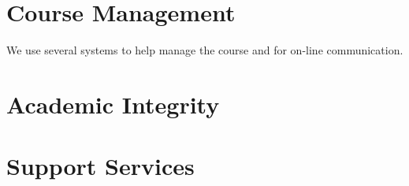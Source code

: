 \documentclass[11pt]{article}
\begin{document}
\section{Course Management}

We use several systems to help manage the course
and for on-line communication.





\section{Academic Integrity}



\section{Support Services}



\printbibliography{}

\lastupdated
\end{document}

